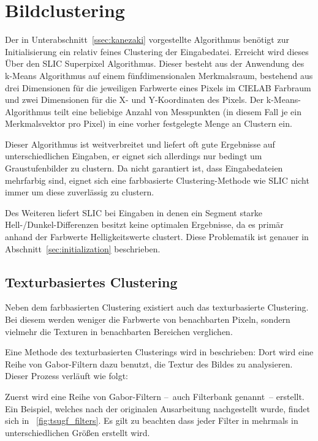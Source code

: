 \section{Bildclustering}
\label{ssec:clustering}

Der in Unterabschnitt~\ref{ssec:kanezaki} vorgestellte Algorithmus benötigt zur Initialisierung ein relativ feines Clustering der Eingabedatei. Erreicht wird dieses Über den SLIC Superpixel Algorithmus. Dieser besteht aus der Anwendung des k-Means Algorithmus auf einem fünfdimensionalen Merkmalsraum, bestehend aus drei Dimensionen für die jeweiligen Farbwerte eines Pixels im CIELAB Farbraum und zwei Dimensionen für die X- und Y-Koordinaten des Pixels. \cite{achanta_10} Der k-Means-Algorithmus teilt eine beliebige Anzahl von Messpunkten (in diesem Fall je ein Merkmalsvektor pro Pixel) in eine vorher festgelegte Menge an Clustern ein.

Dieser Algorithmus ist weitverbreitet und liefert oft gute Ergebnisse auf unterschiedlichen Eingaben, er eignet sich allerdings nur bedingt um Graustufenbilder zu clustern. Da nicht garantiert ist, dass Eingabedateien mehrfarbig sind, eignet sich eine farbbasierte Clustering-Methode wie SLIC nicht immer um diese zuverlässig zu clustern. 

Des Weiteren liefert SLIC bei Eingaben in denen ein Segment starke Hell-/Dunkel-Differenzen besitzt keine optimalen Ergebnisse, da es primär anhand der Farbwerte \bzw Helligkeitswerte clustert. Diese Problematik ist genauer in Abschnitt~\ref{sec:initialization} beschrieben.

\subsection{Texturbasiertes Clustering}
\label{ssec:tsugf}

Neben dem farbbasierten Clustering existiert auch das texturbasierte Clustering. Bei diesem werden weniger die Farbwerte von benachbarten Pixeln, sondern vielmehr die Texturen in benachbarten Bereichen verglichen.

Eine Methode des texturbasierten Clusterings wird in \cite{jain_91} beschrieben: Dort wird eine Reihe von Gabor-Filtern dazu benutzt, die Textur des Bildes zu analysieren. Dieser Prozess verläuft wie folgt:

Zuerst wird eine Reihe von Gabor-Filtern --~auch Filterbank genannt~-- erstellt. Ein Beispiel, welches nach der originalen Ausarbeitung nachgestellt wurde, findet sich in \figurename~\ref{fig:tsugf_filters}. Es gilt zu beachten dass jeder Filter in mehrmals in unterschiedlichen Größen erstellt wird.

